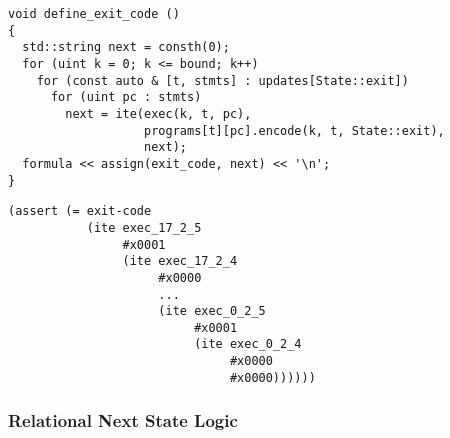 \begin{lstlisting}[style=c++]
void define_exit_code ()
{
  std::string next = consth(0);
  for (uint k = 0; k <= bound; k++)
    for (const auto & [t, stmts] : updates[State::exit])
      for (uint pc : stmts)
        next = ite(exec(k, t, pc),
                   programs[t][pc].encode(k, t, State::exit),
                   next);
  formula << assign(exit_code, next) << '\n';
}
\end{lstlisting}

\begin{lstlisting}[language=smtlib]
(assert (= exit-code
           (ite exec_17_2_5
                #x0001
                (ite exec_17_2_4
                     #x0000
                     ...
                     (ite exec_0_2_5
                          #x0001
                          (ite exec_0_2_4
                               #x0000
                               #x0000))))))
\end{lstlisting}

\newpage

\subsubsection{Relational Next State Logic}

